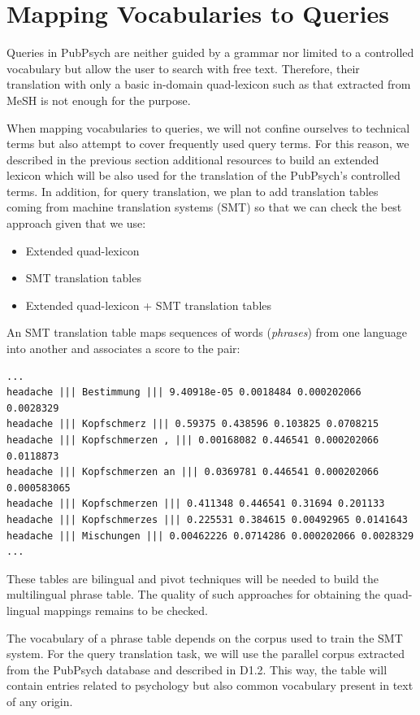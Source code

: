 \documentclass[a4paper,11pt]{article}
\begin{document}
\section{Mapping Vocabularies to Queries}
\label{s:smt}

Queries in PubPsych are neither guided by a grammar nor limited to a controlled vocabulary but allow the user to search with free text. Therefore, their translation with only a basic in-domain quad-lexicon such as that extracted from MeSH is not enough for the purpose.

When mapping vocabularies to queries, we will not confine ourselves to technical terms but also attempt to cover frequently used query terms. For this reason, we described in the previous section additional resources to build an extended lexicon which will be also used for the translation of the PubPsych's controlled terms. In addition, for query translation, we plan to add translation tables coming from machine translation systems (SMT) so that we can check the best approach given that we use:

\begin{itemize}
 \item Extended quad-lexicon
 \item SMT translation tables
 \item Extended quad-lexicon + SMT translation tables 
\end{itemize}

An SMT translation table maps sequences of words (\emph{phrases}) from one language into another and associates a score to the pair:

{\small
\begin{verbatim}
...
headache ||| Bestimmung ||| 9.40918e-05 0.0018484 0.000202066 0.0028329
headache ||| Kopfschmerz ||| 0.59375 0.438596 0.103825 0.0708215 
headache ||| Kopfschmerzen , ||| 0.00168082 0.446541 0.000202066 0.0118873 
headache ||| Kopfschmerzen an ||| 0.0369781 0.446541 0.000202066 0.000583065 
headache ||| Kopfschmerzen ||| 0.411348 0.446541 0.31694 0.201133 
headache ||| Kopfschmerzes ||| 0.225531 0.384615 0.00492965 0.0141643 
headache ||| Mischungen ||| 0.00462226 0.0714286 0.000202066 0.0028329 
...
\end{verbatim}
}

These tables are bilingual and pivot techniques will be needed to build the multilingual phrase table. The quality of such approaches for obtaining the quad-lingual mappings remains to be checked.

The vocabulary of a phrase table depends on the corpus used to train the SMT system. For the query translation task, we will use the parallel corpus extracted from the PubPsych database and described in D1.2. This way, the table will contain entries related to psychology but also common vocabulary present in text of any origin.
\end{document}
